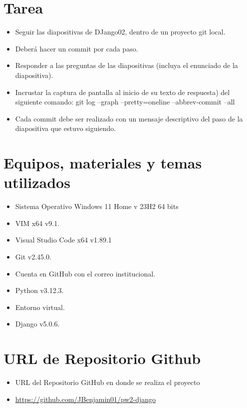 \documentclass{article}
\begin{document}
	\section{Tarea}
	\begin{itemize}		
            \item Seguir las diapositivas de DJango02, dentro de un proyecto git local.
            \item Deberá hacer un commit por cada paso.
            \item Responder a las preguntas de las diapositivas (incluya el enunciado de la diapositiva).
            \item Incrustar la captura de pantalla al inicio de su texto de respuesta) del siguiente comando: git log --graph --pretty=oneline --abbrev-commit --all
            \item Cada commit debe ser realizado con un mensaje descriptivo del paso de la diapositiva que estuvo siguiendo.
	\end{itemize}
		
	\section{Equipos, materiales y temas utilizados}
	\begin{itemize}
            \item Sistema Operativo Windows 11 Home v 23H2 64 bits
            \item VIM x64 v9.1.
            \item Visual Studio Code x64 v1.89.1
            \item Git v2.45.0.
            \item Cuenta en GitHub con el correo institucional.
            \item Python v3.12.3.
            \item Entorno virtual.
            \item Django v5.0.6.
	\end{itemize}
	
	\section{URL de Repositorio Github}
	\begin{itemize}
            \item URL del Repositorio GitHub en donde se realiza el proyecto
            \item \url{https://github.com/JBenjamin01/pw2-django}
	\end{itemize}
\end{document}
